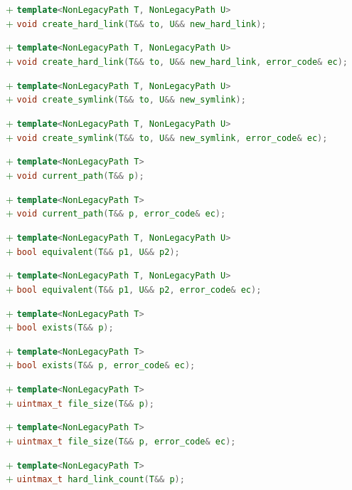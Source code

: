 \documentclass[11pt]{article}
\newcommand{\code}[2][cpp]{\lstinline[language=#1,basicstyle=\small\ttfamily]{#2}}
\newcommand{\tsreplace}[3]{\textcolor{red}{\sout{#1}}#2\textcolor{darkgreen}{#3}}
\begin{document}
\tsreplace{}{}{+ \code{template<NonLegacyPath T, NonLegacyPath U>}}\\
\tsreplace{}{}{+ \code{void create_hard_link(T&& to, U&& new_hard_link);}}

\tsreplace{}{}{+ \code{template<NonLegacyPath T, NonLegacyPath U>}}\\
\tsreplace{}{}{+ \code{void create_hard_link(T&& to, U&& new_hard_link, error_code& ec);}}

\tsreplace{}{}{+ \code{template<NonLegacyPath T, NonLegacyPath U>}}\\
\tsreplace{}{}{+ \code{void create_symlink(T&& to, U&& new_symlink);}}

\tsreplace{}{}{+ \code{template<NonLegacyPath T, NonLegacyPath U>}}\\
\tsreplace{}{}{+ \code{void create_symlink(T&& to, U&& new_symlink, error_code& ec);}}

\tsreplace{}{}{+ \code{template<NonLegacyPath T>}}\\
\tsreplace{}{}{+ \code{void current_path(T&& p);}}

\tsreplace{}{}{+ \code{template<NonLegacyPath T>}}\\
\tsreplace{}{}{+ \code{void current_path(T&& p, error_code& ec);}}

\tsreplace{}{}{+ \code{template<NonLegacyPath T, NonLegacyPath U>}}\\
\tsreplace{}{}{+ \code{bool equivalent(T&& p1, U&& p2);}}

\tsreplace{}{}{+ \code{template<NonLegacyPath T, NonLegacyPath U>}}\\
\tsreplace{}{}{+ \code{bool equivalent(T&& p1, U&& p2, error_code& ec);}}

\tsreplace{}{}{+ \code{template<NonLegacyPath T>}}\\
\tsreplace{}{}{+ \code{bool exists(T&& p);}}

\tsreplace{}{}{+ \code{template<NonLegacyPath T>}}\\
\tsreplace{}{}{+ \code{bool exists(T&& p, error_code& ec);}}

\tsreplace{}{}{+ \code{template<NonLegacyPath T>}}\\
\tsreplace{}{}{+ \code{uintmax_t file_size(T&& p);}}

\tsreplace{}{}{+ \code{template<NonLegacyPath T>}}\\
\tsreplace{}{}{+ \code{uintmax_t file_size(T&& p, error_code& ec);}}

\tsreplace{}{}{+ \code{template<NonLegacyPath T>}}\\
\tsreplace{}{}{+ \code{uintmax_t hard_link_count(T&& p);}}
\end{document}
